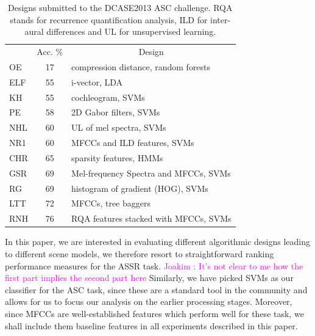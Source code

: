 \documentclass[journal]{IEEEtran}
\newcommand{\gl}[1]{\textcolor{red}{Gr\'egoire : #1}}
\newcommand{\ja}[1]{\textcolor{magenta}{Joakim : #1}}
\begin{document}
\begin{table}
\begin{center}
\begin{tabular}{lcl}
& Acc. \%  &  \multicolumn{1}{c}{Design}  \\
\cite{olivetti2013wonder} OE & 17 & compression distance, random forests \\
\cite{elizalde2013vector} ELF & 55 & i-vector, LDA \\
\cite{krijnders2013tone} KH & 55 & cochleogram, SVMs \\
\cite{patil2013multiresolution} PE & 58 & 2D Gabor filters, SVMs \\
\cite{lee2013acoustic} NHL & 60 & UL of mel spectra, SVMs \\
\cite{nogueira2013sound} NR1 & 60 & MFCCs and ILD features, SVMs \\
\cite{chum2013ieee} CHR & 65 & sparsity features, HMMs  \\
\cite{geiger2013large} GSR & 69 & Mel-frequency Spectra and MFCCs, SVMs \\
\cite{rakotomamonjy2015histogram} RG & 69 & histogram of gradient (HOG), SVMs \\
\cite{li2013auditory} LTT & 72 & MFCCs, tree baggers \\
\cite{roma2013recurrence} RNH & 76 & RQA features stacked with MFCCs, SVMs \\
\end{tabular}
\end{center}
\caption{Designs submitted to the DCASE2013 ASC challenge. RQA stands for recurrence quantification analysis, ILD for inter-aural differences and UL for unsupervised learning. \label{tab:dcase}}
\end{table}

In this paper, we are interested in evaluating different algorithmic designs leading to different scene models, we therefore resort to straightforward ranking performance measures for the ASSR task. \ja{It's not clear to me how the first part implies the second part here} Similarly, we have picked SVMs as our classifier for the ASC task, since these are a standard tool in the community and allows for us to focus our analysis on the earlier processing stages. Moreover, since MFCCs are well-established features which perform well for these task, we shall include them baseline features in all experiments described in this paper.

\end{document}
